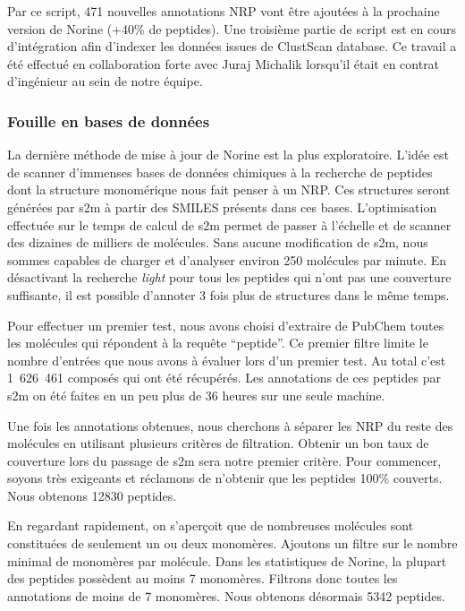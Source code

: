 Par ce script, 471 nouvelles annotations NRP vont être ajoutées à la prochaine version de Norine (+40\% de peptides).
Une troisième partie de script est en cours d'intégration afin d'indexer les données issues de ClustScan database.
Ce travail a été effectué en collaboration forte avec Juraj Michalik lorsqu'il était en contrat d'ingénieur au sein de notre équipe.



\subsubsection{Fouille en bases de données}

La dernière méthode de mise à jour de Norine est la plus exploratoire.
L'idée est de scanner d'immenses bases de données chimiques à la recherche de peptides dont la structure monomérique nous fait penser à un NRP.
Ces structures seront générées par s2m à partir des SMILES présents dans ces bases.
L'optimisation effectuée sur le temps de calcul de s2m permet de passer à l'échelle et de scanner des dizaines de milliers de molécules.
Sans aucune modification de s2m, nous sommes capables de charger et d'analyser environ 250 molécules par minute.
En désactivant la recherche \textit{light} pour tous les peptides qui n'ont pas une couverture suffisante, il est possible d'annoter 3 fois plus de structures dans le même temps.

Pour effectuer un premier test, nous avons choisi d'extraire de PubChem toutes les molécules qui répondent à la requête ``peptide''.
Ce premier filtre limite le nombre d'entrées que nous avons à évaluer lors d'un premier test.
Au total c'est 1~626~461 composés qui ont été récupérés.
Les annotations de ces peptides par s2m on été faites en un peu plus de 36 heures sur une seule machine.

Une fois les annotations obtenues, nous cherchons à séparer les NRP du reste des molécules en utilisant plusieurs critères de filtration.
Obtenir un bon taux de couverture lors du passage de s2m sera notre premier critère.
Pour commencer, soyons très exigeants et réclamons de n'obtenir que les peptides 100\% couverts.
Nous obtenons 12830 peptides.

En regardant rapidement, on s'aperçoit que de nombreuses molécules sont constituées de seulement un ou deux monomères.
Ajoutons un filtre sur le nombre minimal de monomères par molécule.
Dans les statistiques de Norine, la plupart des peptides possèdent au moins 7 monomères.
Filtrons donc toutes les annotations de moins de 7 monomères.
Nous obtenons désormais 5342 peptides.

